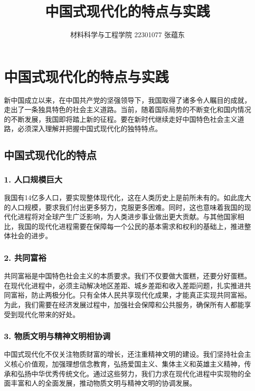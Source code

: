 \documentclass[12pt]{article}
\title{中国式现代化的特点与实践}
\author{材料科学与工程学院 22301077 张蕴东}
\date{}
\begin{document}
\maketitle

\section*{中国式现代化的特点与实践}

新中国成立以来，在中国共产党的坚强领导下，我国取得了诸多令人瞩目的成就，走出了一条独具特色的社会主义道路。当前，随着国际局势的不断变化和国内情况的不断发展，我国即将踏上新的征程。要在新时代继续走好中国特色社会主义道路，必须深入理解并把握中国式现代化的独特特点。

\subsection*{中国式现代化的特点}

\subsubsection*{1. 人口规模巨大}

我国有14亿多人口，要实现整体现代化，这在人类历史上是前所未有的。如此庞大的人口规模，要求我们付出更多努力，克服更多困难。同时，这也意味着我国的现代化进程将对全球产生广泛影响，为人类进步事业做出更大贡献。与其他国家相比，我国的现代化进程需要在保障每一个公民的基本需求和权利的基础上，推进整体社会的进步。

\subsubsection*{2. 共同富裕}

共同富裕是中国特色社会主义的本质要求。我们不仅要做大蛋糕，还要分好蛋糕。在现代化进程中，必须主动解决地区差距、城乡差距和收入差距问题，扎实推进共同富裕，防止两极分化。只有全体人民共享现代化成果，才能真正实现共同富裕。为此，我们需要在经济发展过程中，加强社会保障和公共服务，确保所有人都能享受到现代化带来的好处。

\subsubsection*{3. 物质文明与精神文明相协调}

中国式现代化不仅关注物质财富的增长，还注重精神文明的建设。我们坚持社会主义核心价值观，加强理想信念教育，弘扬爱国主义、集体主义和英雄主义精神，传承和弘扬中华优秀传统文化。通过这些努力，我们力求在现代化进程中实现物的全面丰富和人的全面发展，推动物质文明与精神文明的协调发展。
\end{document}
